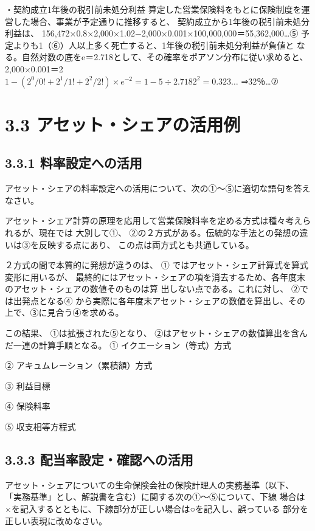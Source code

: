 \documentclass[report,gutter=10mm,fore-edge=10mm,uplatex,dvipdfmx]{jlreq}
\begin{document}
・契約成立1年後の税引前未処分利益
算定した営業保険料をもとに保険制度を運営した場合、事業が予定通りに推移すると、
契約成立から1年後の税引前未処分利益は、
156,472×0.8×2,000×1.02−2,000×0.001×100,000,000＝55,362,000…⑤
予定よりも1（⑥）人以上多く死亡すると、1年後の税引前未処分利益が負値と
なる。自然対数の底をe＝2.718として、その確率をポアソン分布に従い求めると、\\
2,000×0.001＝2\\
$1-(2^0/0!+2^1/1!+2^2/2!)×e^{−2}=1−5\div2.7182^2=0.323…$
⇒32％…⑦
\section{3.3 アセット・シェアの活用例}
\subsection{3.3.1 料率設定への活用}

アセット・シェアの料率設定への活用について、次の①～⑤に適切な語句を答えなさい。

アセット・シェア計算の原理を応用して営業保険料率を定める方式は種々考えられるが、現在では
大別して①、 ②の２方式がある。伝統的な手法との発想の違いは③を反映する点にあり、
この点は両方式とも共通している。

２方式の間で本質的に発想が違うのは、 ①
ではアセット・シェア計算式を算式変形に用いるが、
最終的にはアセット・シェアの項を消去するため、各年度末のアセット・シェアの数値そのものは算
出しない点である。これに対し、 ②では出発点となる④
から実際に各年度末アセット・シェアの数値を算出し、その上で、③に見合う④を求める。

この結果、 ①は拡張された⑤となり、 ②はアセット・シェアの数値算出を含んだ一連の計算手順となる。
\answer{}
① イクエーション（等式）方式\par
② アキュムレーション（累積額）方式\par
③ 利益目標\par
④ 保険料率\par
⑤ 収支相等方程式\par

\subsection{3.3.3 配当率設定・確認への活用}
アセット・シェアについての生命保険会社の保険計理人の実務基準（以下、
「実務基準」とし、解説書を含む）に関する次の①～⑤について、下線
場合は×を記入するとともに、下線部分が正しい場合は○を記入し、誤っている
部分を正しい表現に改めなさい。
\end{document}
